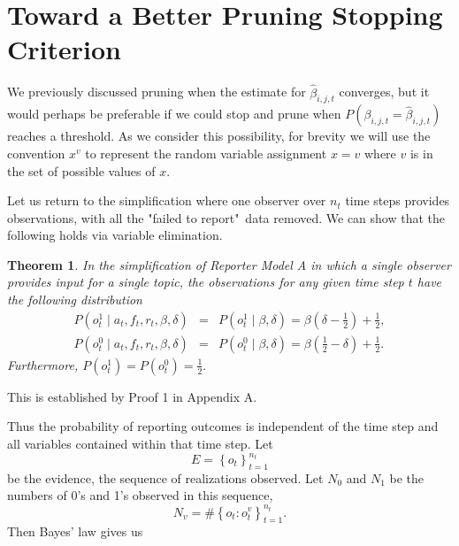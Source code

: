 \documentclass{amsart}
\newtheorem{theorem}{Theorem}
\theoremstyle{plain}
\numberwithin{equation}{section}
\begin{document}
\section{Toward a Better Pruning Stopping Criterion}

We previously discussed pruning when the estimate for $\hat{\beta}_{i,j,t}$
converges, but it would perhaps be preferable if we could stop and prune
when $P\left( \beta _{i,j,t}=\hat{\beta}_{i,j,t}\right) $ reaches a
threshold. As we consider this possibility, for brevity we will use the
convention $x^{v}$ to represent the random variable assignment $x=v$ where $v
$ is in the set of possible values of $x$.

Let us return to the simplification where one observer over $n_{t}$ time
steps provides observations, with all the "failed to report"\ data removed.
We can show that the following holds via variable elimination. 

\begin{theorem}
\label{t1}In the simplification of Reporter Model A in which a single
observer provides input for a single topic, the observations for any given
time step $t$ have the following distribution%
\begin{eqnarray*}
P\left( o_{t}^{1}\mid a_{t},f_{t},r_{t},\beta ,\delta \right)  &=&P\left(
o_{t}^{1}\mid \beta ,\delta \right) =\beta \left( \delta -\frac{1}{2}\right)
+\frac{1}{2}, \\
P\left( o_{t}^{0}\mid a_{t},f_{t},r_{t},\beta ,\delta \right)  &=&P\left(
o_{t}^{0}\mid \beta ,\delta \right) =\beta \left( \frac{1}{2}-\delta \right)
+\frac{1}{2}.
\end{eqnarray*}%
Furthermore, $P\left( o_{t}^{1}\right) =P\left( o_{t}^{0}\right) =\frac{1}{2}%
.$
\end{theorem}

This is established by Proof 1 in Appendix A. 

Thus the probability of reporting outcomes is independent of the time step
and all variables contained within that time step. Let 
\begin{equation*}
E=\left\{ o_{t}\right\} _{t=1}^{n_{t}}
\end{equation*}%
be the evidence, the sequence of realizations observed. Let $N_{0}$ and $%
N_{1}$ be the numbers of 0's and 1's observed in this sequence,%
\begin{equation*}
N_{v}=\#\left\{ o_{t}:o_{t}^{v}\right\} _{t=1}^{n_{t}}.
\end{equation*}%
Then Bayes' law gives us
\end{document}
